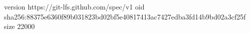 version https://git-lfs.github.com/spec/v1
oid sha256:88375e6360f89b031823bd02bf5e40817413ac7427edba3fd14b9bd02a3cf25f
size 22000
